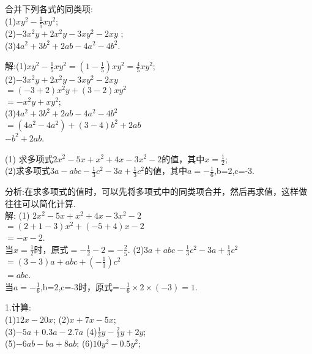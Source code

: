 \documentclass[UTF8]{report}
\theoremstyle{definition}
\theoremstyle{remark}
\begin{document}
\begin{exercise}合并下列各式的同类项:
 \\(1)$xy^{2}-\frac{1}{5}xy^{2}$;
 \\(2)$-3x^{2}y+2x^{2}y-3xy^{2}-2xy$ ;
 \\(3)$4a^{2}+3b^{2}+2ab-4a^{2}-4b^{2}$.
 \end{exercise}
 \begin{Answer}
 解:(1)$xy^{2}-\frac{1}{5}xy^{2}=(1-\frac{1}{5})xy^{2}=\frac{4}{5}xy^{2}$;
 \\(2)$-3x^{2}y+2x^{2}y-3xy^{2}-2xy$
 \\$=(-3+2)x^{2}y+(3-2)xy^{2}$
 \\$=-x^{2}y+xy^{2}$;
 \\(3)$4a^{2}+3b^{2}+2ab-4a^{2}-4b^{2}$
 \\$=(4a^{2}-4a^{2})+(3-4)b^{2}+2ab$
 \\$-b^{2}+2ab$.
 \end{Answer}

\begin{exercise}
(1) 求多项式$2x^{2}-5x+x^{2}+4x-3x^{2}-2$的值，其中$x=\frac{1}{2}$;
 \\(2)求多项式$3a-abc-\frac{1}{3}c^{2}-3a+\frac{1}{3}c^{2}$的値，其中$a=-\frac{1}{6}$,b=2,c=-3.
\end{exercise}
 \begin{Answer}
分析:在求多项式的值时，可以先将多项式中的同类项合并，然后再求值，这样做往往可以简化计算.
\\ 解: (1) $2x^{2}-5x+x^{2}+4x-3x^{2}-2$
      \\$=(2+1-3)x^{2}+(-5+4)x-2$
      \\$=-x-2$.
\\ 当$x=\frac{1}{2}$时，原式$=-\frac{1}{2}-2=-\frac{2}{5}$.
(2)$3a+abc-\frac{1}{3}c^{2}-3a+\frac{1}{3}c^{2}$
\\$=(3-3)a+abc+(-\frac{1}{3})c^{2}$
\\$=abc$.
\\ 当$a=-\frac{1}{6}$,b=2,c=-3时，原式=$-\frac{1}{6}\times2\times(-3)=1$.
\end{Answer}

\begin{exercise}
1.计算:
      \\(1)$12x-20x$;  (2)$x+7x-5x$;
      \\(3)$-5a+0.3a-2.7a$  (4)$\frac{1}{3}y-\frac{2}{3}y+2y$;
      \\(5)$-6ab-ba+8ab$;  (6)$10y^{2}-0.5y^{2}$;
\end{exercise}
\end{document}
